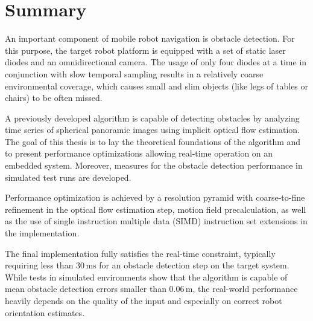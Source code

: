 \chapter*{Summary}

An important component of mobile robot navigation is obstacle detection. For this purpose, the target robot platform is equipped with a set of static laser diodes and an omnidirectional camera. The usage of only four diodes at a time in conjunction with slow temporal sampling results in a relatively coarse environmental coverage, which causes small and slim objects (like legs of tables or chairs) to be often missed.

A previously developed algorithm is capable of detecting obstacles by analyzing time series of spherical panoramic images using implicit optical flow estimation. The goal of this thesis is to lay the theoretical foundations of the algorithm and to present performance optimizations allowing real-time operation on an embedded system. Moreover, measures for the obstacle detection performance in simulated test runs are developed.

Performance optimization is achieved by a resolution pyramid with coarse-to-fine refinement in the optical flow estimation step, motion field precalculation, as well as the use of single instruction multiple data (SIMD) instruction set extensions in the implementation.

The final implementation fully satisfies the real-time constraint, typically requiring less than $30\,\mathrm{ms}$ for an obstacle detection step on the target system. While tests in simulated environments show that the algorithm is capable of mean obstacle detection errors smaller than $0.06\,\mathrm{m}$, the real-world performance heavily depends on the quality of the input and especially on correct robot orientation estimates.
